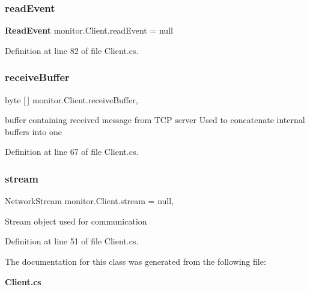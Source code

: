 \subsubsection{read\+Event}
{\footnotesize\ttfamily \textbf{ Read\+Event} monitor.\+Client.\+read\+Event = null\hspace{0.3cm}{\ttfamily [static]}}



Definition at line 82 of file Client.\+cs.

\mbox{\label{classmonitor_1_1_client_aade32a6043e0dc629509f0e1c0112a24}} 
\subsubsection{receive\+Buffer}
{\footnotesize\ttfamily byte [$\,$] monitor.\+Client.\+receive\+Buffer\hspace{0.3cm}{\ttfamily [static]}, {\ttfamily [private]}}



buffer containing received message from T\+CP server Used to concatenate internal buffers into one 



Definition at line 67 of file Client.\+cs.

\mbox{\label{classmonitor_1_1_client_a8de2a9e4fe2c2e896849ddd33d80d759}} 
\subsubsection{stream}
{\footnotesize\ttfamily Network\+Stream monitor.\+Client.\+stream = null\hspace{0.3cm}{\ttfamily [static]}, {\ttfamily [private]}}



Stream object used for communication 



Definition at line 51 of file Client.\+cs.



The documentation for this class was generated from the following file\+:\begin{DoxyCompactItemize}
\item 
\textbf{ Client.\+cs}\end{DoxyCompactItemize}
